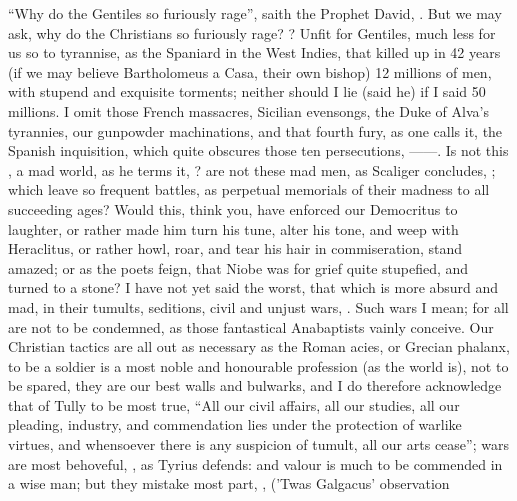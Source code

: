 \enquote{Why do the Gentiles so furiously rage}, saith the Prophet David,
. But we may ask, why do the Christians so furiously
rage? ?
Unfit for Gentiles, much less for us so to tyrannise, as the Spaniard in the
West Indies, that killed up in 42 years (if we may believe
Bartholomeus a Casa, their own bishop) 12 millions of men,
with stupend and exquisite torments; neither should I lie (said he) if I said
50 millions. I omit those French massacres, Sicilian evensongs,
the Duke of Alva's tyrannies, our gunpowder machinations,
and that fourth fury, as one calls it, the Spanish
inquisition, which quite obscures those ten persecutions,
------. Is not this
, a mad world, as he terms it,
? are not these mad men, as Scaliger
concludes, ; which leave so frequent battles, as
perpetual memorials of their madness to all succeeding ages? Would this, think
you, have enforced our Democritus to laughter, or rather made him turn his
tune, alter his tone, and weep with Heraclitus, or rather
howl, roar, and tear his hair in commiseration, stand
amazed; or as the poets feign, that Niobe was for grief quite stupefied, and
turned to a stone? I have not yet said the worst, that which is more absurd and
mad, in their tumults, seditions, civil and unjust wars,
.
Such wars I mean; for all are not to be condemned, as those fantastical
Anabaptists vainly conceive. Our Christian tactics are all out as necessary as
the Roman acies, or Grecian phalanx, to be a soldier is a most noble and
honourable profession (as the world is), not to be spared, they are our best
walls and bulwarks, and I do therefore acknowledge that of
Tully to be most true, \enquote{All our civil affairs, all our
studies, all our pleading, industry, and commendation lies under the protection
of warlike virtues, and whensoever there is any suspicion of tumult, all our
arts cease}; wars are most behoveful, , as Tyrius defends: and valour is much to be
commended in a wise man; but they mistake most part, , \etc{} ('Twas Galgacus' observation
